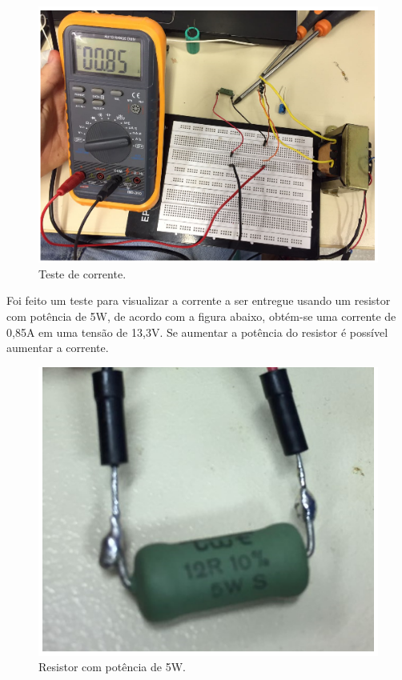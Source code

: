  \begin{figure}[H]
	\centering
	\includegraphics[scale=0.5]{figuras/testedecorrentecarregador}
	\caption{Teste de corrente.}
	\label{img:testedecorrentecarregador}
\end{figure}

Foi feito um teste para visualizar a corrente a ser entregue usando um resistor com potência de 5W, de acordo com a figura abaixo, obtém-se uma corrente de 0,85A em uma tensão de 13,3V. Se aumentar a potência do resistor é possível aumentar a corrente.


 \begin{figure}[H]
	\centering
	\includegraphics[scale=0.5]{figuras/resistorpotencia5w}
	\caption{Resistor com potência de 5W.}
	\label{img:resistorpotencia5w}
\end{figure}

